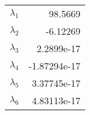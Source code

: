 \begin{tabular}{lr}
\hline
 $\lambda_1$ & 98.5669      \\
 $\lambda_2$ & -6.12269     \\
 $\lambda_3$ &  2.2899e-17  \\
 $\lambda_4$ & -1.87294e-17 \\
 $\lambda_5$ &  3.37745e-17 \\
 $\lambda_6$ &  4.83113e-17 \\
\hline
\end{tabular}